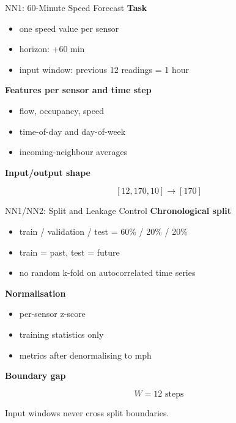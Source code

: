 \documentclass[aspectratio=169]{beamer}
\begin{document}
\begin{frame}{NN1: 60-Minute Speed Forecast}
\small
\textbf{Task}
\begin{itemize}
  \item one speed value per sensor
  \item horizon: +60 min
  \item input window: previous 12 readings = 1 hour
\end{itemize}

\vspace{0.7em}
\textbf{Features per sensor and time step}
\begin{itemize}
  \item flow, occupancy, speed
  \item time-of-day and day-of-week
  \item incoming-neighbour averages
\end{itemize}

\vspace{0.7em}
\textbf{Input/output shape}

\[
[12, 170, 10] \rightarrow [170]
\]
\end{frame}

\begin{frame}{NN1/NN2: Split and Leakage Control}
\small
\textbf{Chronological split}

\begin{itemize}
  \item train / validation / test = 60\% / 20\% / 20\%
  \item train = past, test = future
  \item no random k-fold on autocorrelated time series
\end{itemize}

\vspace{0.7em}
\textbf{Normalisation}

\begin{itemize}
  \item per-sensor z-score
  \item training statistics only
  \item metrics after denormalising to mph
\end{itemize}

\vspace{0.7em}
\textbf{Boundary gap}

\[
W = 12 \text{ steps}
\]

Input windows never cross split boundaries.
\end{frame}
\end{document}
